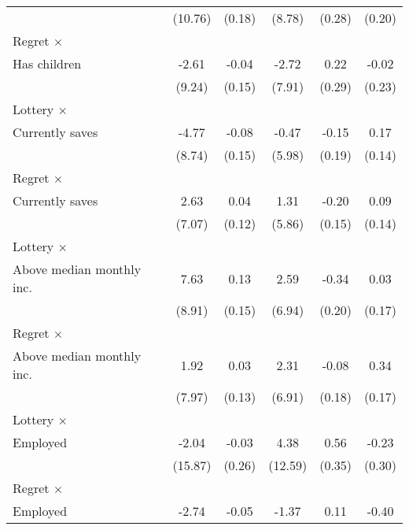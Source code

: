 \begin{table}[htbp]
\begin{tabular}{l*{5}{c}}
                &  (10.76)         &   (0.18)         &   (8.78)         &   (0.28)         &   (0.20)         \\
\addlinespace
Regret $\times$ \\ Has children&    -2.61         &    -0.04         &    -2.72         &     0.22         &    -0.02         \\
                &   (9.24)         &   (0.15)         &   (7.91)         &   (0.29)         &   (0.23)         \\
\addlinespace
Lottery $\times$ \\ Currently saves&    -4.77         &    -0.08         &    -0.47         &    -0.15         &     0.17         \\
                &   (8.74)         &   (0.15)         &   (5.98)         &   (0.19)         &   (0.14)         \\
\addlinespace
Regret $\times$ \\ Currently saves&     2.63         &     0.04         &     1.31         &    -0.20         &     0.09         \\
                &   (7.07)         &   (0.12)         &   (5.86)         &   (0.15)         &   (0.14)         \\
\addlinespace
Lottery $\times$ \\ Above median monthly inc.&     7.63         &     0.13         &     2.59         &    -0.34\sym{*}  &     0.03         \\
                &   (8.91)         &   (0.15)         &   (6.94)         &   (0.20)         &   (0.17)         \\
\addlinespace
Regret $\times$ \\ Above median monthly inc.&     1.92         &     0.03         &     2.31         &    -0.08         &     0.34\sym{**} \\
                &   (7.97)         &   (0.13)         &   (6.91)         &   (0.18)         &   (0.17)         \\
\addlinespace
Lottery $\times$ \\ Employed&    -2.04         &    -0.03         &     4.38         &     0.56         &    -0.23         \\
                &  (15.87)         &   (0.26)         &  (12.59)         &   (0.35)         &   (0.30)         \\
\addlinespace
Regret $\times$ \\ Employed&    -2.74         &    -0.05         &    -1.37         &     0.11         &    -0.40         \\

\end{tabular}
\end{table}
